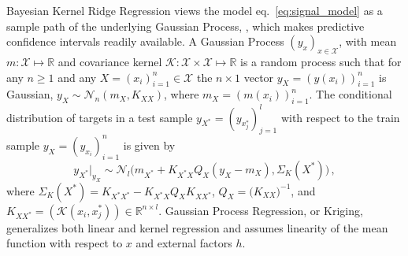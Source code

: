 \documentclass[conference]{IEEEtran}
\newcommand{\Ncal}{\mathcal{N}}
\newcommand{\Kcal}{\mathcal{K}}
\newcommand{\Xcal}{\mathcal{X}}
\newcommand{\Real}{\mathbb{R}}
\begin{document}
Bayesian Kernel Ridge Regression views the model eq.~\ref{eq:signal_model} as a sample
path of the underlying Gaussian Process, \cite{rasmussen2006}, which makes predictive
confidence intervals readily available. A Gaussian Process $(y_x)_{x\in \Xcal}$, with
mean $m : \Xcal \mapsto \Real$ and covariance kernel  $\Kcal : \Xcal \times \Xcal \mapsto \Real$
is a random process such that for any $n\geq1$ and any $X = (x_i)_{i=1}^n \in \Xcal$
the $n\times 1$ vector $y_X = (y(x_i))_{i=1}^n$ is Gaussian, $y_X \sim \Ncal_n(m_X, K_{XX})$,
where $m_X = (m(x_i))_{i=1}^n$. The conditional distribution of targets in a test sample
$y_{X^*} = (y_{x^*_j})_{j=1}^l$ with respect to the train sample $y_X = (y_{x_i})_{i=1}^n$
is given by
\begin{equation} \label{eq:cond_distr}
  y_{X^*}\vert_{y_X}
    \sim \Ncal_l\bigl(
      m_{X^*} + K_{X^*X} Q_X (y_X - m_X),
      \Sigma_K(X^*)
    \bigr)
    \,,
\end{equation}
where $\Sigma_K(X^*) = K_{X^*X^*} - K_{X^*X} Q_X K_{XX^*}$, $Q_X = \bigl(K_{XX}\bigr)^{-1}$,
and $K_{XX^*} = (\Kcal(x_i, x^*_j))\in \Real^{n\times l}$. Gaussian Process Regression,
or Kriging, generalizes both linear and kernel regression and assumes linearity of the
mean function with respect to $x$ and external factors $h$.
\end{document}
